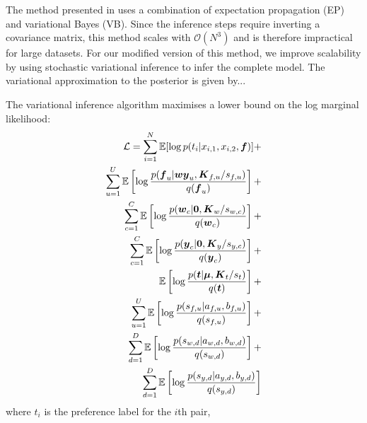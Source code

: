 The method presented in \cite{houlsby2012collaborative} uses a combination of expectation propagation (EP) and variational Bayes (VB). Since the inference steps require inverting a covariance matrix, this method scales with 
$\mathcal{O}(N^3)$ and is therefore impractical for large datasets. For our modified version of this method, we improve scalability by using stochastic variational inference to infer the complete model. 
The variational approximation to the posterior is given by...

The variational inference algorithm maximises a lower bound on the log marginal likelihood:
\begin{eqnarray}
  \mathcal{L} = \sum_{i=1}^N \mathbb{E}[ \log p(t_i | x_{i,1}, x_{i,2}, \boldsymbol f) ] + \nonumber\\
  \sum_{u=1}^U  \mathbb{E}\left[ \log \frac{p(\boldsymbol f_u | \boldsymbol w \boldsymbol y_u, \boldsymbol K_{f,u} / s_{f,u} )}{q(\boldsymbol f_u)}\right] + \nonumber\\
  \sum_{c=1}^C \mathbb{E}\left[\log\frac{p(\boldsymbol w_c | \boldsymbol 0, \boldsymbol K_w / s_{w,c} ) }{q(\boldsymbol w_c) } \right] + \nonumber\\
  \sum_{c=1}^C \mathbb{E}\left[\log\frac{p(\boldsymbol y_c | \boldsymbol 0, \boldsymbol K_y / s_{y,c} ) }{q(\boldsymbol y_c) } \right] + \nonumber\\
  \mathbb{E}\left[\log\frac{p(\boldsymbol t | \boldsymbol \mu, \boldsymbol K_{t} / s_t ) }{q(\boldsymbol t)} \right] + \nonumber\\
  \sum_{u=1}^U \mathbb{E}\left[\log\frac{p(s_{f,u} | a_{f,u}, b_{f,u})}{q(s_{f,u})}\right] + \nonumber\\
  \sum_{d=1}^D \mathbb{E}\left[\log\frac{p(s_{w,d} | a_{w,d}, b_{w,d})}{q(s_{w,d})}\right] +\nonumber\\
  \sum_{d=1}^D \mathbb{E}\left[\log\frac{p(s_{y,d} | a_{y,d}, b_{y,d})}{q(s_{y,d})}\right] 
\end{eqnarray}
where $t_i$ is the preference label for the $i$th pair, 


